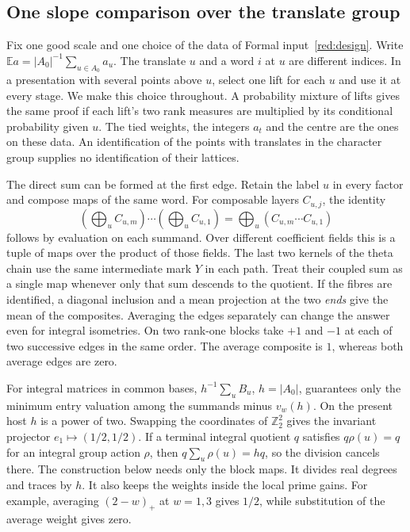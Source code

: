 \subsection{One slope comparison over the translate group}\label{geo:translate}

Fix one good scale and one choice of the data of Formal input~\ref{red:design}.
Write \(\mathbb E a=|A_0|^{-1}\sum_{u\in A_0}a_u\). The translate \(u\)
and a word \(i\) at \(u\) are different indices. In a presentation with
several points above \(u\), select one lift for each \(u\) and use it
at every stage. We make this choice throughout. A probability mixture
of lifts gives the same proof if each lift's two rank measures are
multiplied by its conditional probability given \(u\).
The tied weights, the integers \(a_t\) and the centre are the ones on
these data. An identification of the points with translates in the
character group supplies no identification of their lattices.

The direct sum can be formed at the first edge. Retain the label \(u\)
in every factor and compose maps of the same word. For composable
layers \(C_{u,j}\), the identity
\[
 (\bigoplus_u C_{u,m})\cdots(\bigoplus_u C_{u,1})
     =\bigoplus_u(C_{u,m}\cdots C_{u,1})
\]
follows by evaluation on each summand. Over different coefficient fields
this is a tuple of maps over the product of those fields. The last two
kernels of the theta chain use the same intermediate mark \(Y\) in
each path. Treat their coupled sum as a single map whenever only that
sum descends to the quotient. If the fibres are identified, a diagonal
inclusion and a mean projection at the two \emph{ends} give the mean
of the composites. Averaging the edges separately can change the
answer even for integral isometries. On two rank-one blocks take \(+1\)
and \(-1\) at each of two successive edges in the same order. The
average composite is \(1\), whereas both average edges are zero.

For integral matrices in common bases, \(h^{-1}\sum_{u}B_u\),
\(h=|A_0|\), guarantees only the minimum entry valuation among the
summands minus \(v_w(h)\). On the present host \(h\) is a power of
two. Swapping the coordinates of \(\mathbb Z_2^2\) gives the
invariant projector \(e_1\mapsto(1/2,1/2)\). If a terminal integral
quotient \(q\) satisfies \(q\rho(u)=q\) for an integral group action
\(\rho\), then \(q\sum_u\rho(u)=hq\), so the division cancels there.
The construction below needs only the block maps. It divides real
degrees and traces by \(h\). It also keeps the weights inside the
local prime gains. For example, averaging \((2-w)_+\) at \(w=1,3\)
gives \(1/2\), while substitution of the average weight gives zero.

